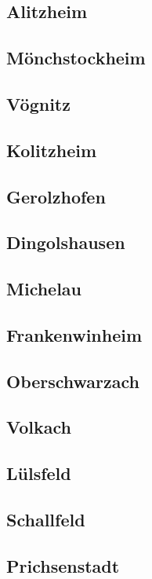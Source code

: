 \documentclass[fontsize=12pt,a4paper]{scrreprt}
\begin{document}
                \subsection{Alitzheim}
                \subsection{Mönchstockheim}
                \subsection{Vögnitz}
                \subsection{Kolitzheim}
                \subsection{Gerolzhofen}
                \subsection{Dingolshausen}
                \subsection{Michelau}
                \subsection{Frankenwinheim}
                \subsection{Oberschwarzach}
                \subsection{Volkach}
                \subsection{Lülsfeld}
                \subsection{Schallfeld}
                \subsection{Prichsenstadt}
\end{document}
